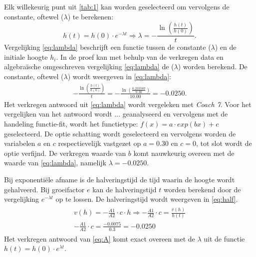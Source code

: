 \documentclass{scrartcl}
\begin{document}
Elk willekeurig punt uit \ref{tab:1} kan worden geselecteerd om vervolgens de constante, oftewel ($\lambda$) te berekenen:
\begin{equation}%
h(t) =h(0) \cdot e^{-\lambda t}
\Rightarrow \lambda = -\frac{\ln\left(\frac{h(t)}{h(0)}\right)}{t}.
\end{equation}
Vergelijking \cref{eq:lambda} beschrijft een functie tussen de constante ($\lambda$) en de initiale hoogte $h_i$. In de proef kan met behulp van de verkregen data en algebraïsche omgeschreven vergelijking \cref{eq:lambda} de ($\lambda$) worden berekend. De constante, oftewel ($\lambda$) wordt weergeven in \cref{eq:lambda}:
\begin{equation}
\begin{split}
-\frac{\ln\left(\frac{h(t)}{h(0)}\right)}{t}=-\frac{\ln\left(\frac{0.233567}{0.30}\right)}{10.00}=-0.0250.  
\end{split}
\end{equation}
Het verkregen antwoord uit \cref{eq:lambda} wordt vergeleken met \textit{Coach 7}. Voor het vergelijken van het antwoord wordt ... geanalyseerd en vervolgens met de handeling functie-fit, wordt het functietype: $f(x)=a \cdot exp(bx)+c$ geselecteerd. De optie schatting wordt geselecteerd en vervolgens worden de variabelen $a$ en $c$ respectievelijk vastgezet op $a=0.30$ en $c=0$, tot slot wordt de optie verfijnd. De verkregen waarde van $b$ komt nauwkeurig overeen met de waarde van \cref{eq:lambda}, namelijk $\lambda=-0.0250$.

Bij exponentiële afname is de halveringstijd de tijd waarin de hoogte wordt gehalveerd. Bij groeifactor $e$ kan de halveringstijd $t$ worden berekend door de vergelijking $e^{-\lambda t}$ op te lossen. De halveringstijd wordt weergeven in \cref{eq:half}.
\begin{align}\label{eq:A}
\begin{split}
v(h) = -\frac{A1}{A2} \cdot c \cdot h \Rightarrow -\frac{A1}{A2} \cdot c =\frac{v(h)}{h(t)}\\
-\frac{A1}{A2} \cdot c = \frac{-0.0075}{0.3} = -0.0250
\end{split}
\end{align}
Het verkregen antwoord van \cref{eq:A} komt exact overeen met de $\lambda$ uit de functie $h(t) = h(0)\cdot e^{\lambda t}$.
\end{document}

